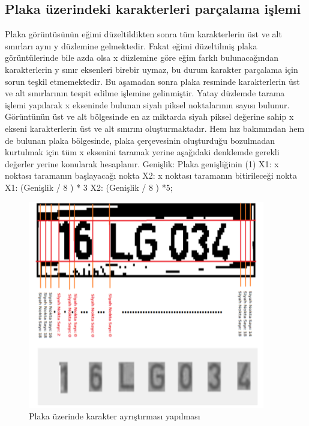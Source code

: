 \subsection{Plaka üzerindeki karakterleri parçalama işlemi}
Plaka görüntüsünün eğimi düzeltildikten sonra tüm karakterlerin üst ve alt sınırları aynı y düzlemine gelmektedir. Fakat eğimi düzeltilmiş plaka görüntülerinde bile azda olsa x düzlemine göre eğim farklı bulunacağından karakterlerin y sınır eksenleri birebir uymaz, bu durum karakter parçalama için sorun teşkil etmemektedir. Bu aşamadan sonra plaka resminde karakterlerin üst ve alt sınırlarının tespit edilme işlemine gelinmiştir. Yatay düzlemde tarama işlemi yapılarak x ekseninde bulunan siyah piksel noktalarının sayısı bulunur. Görüntünün üst ve alt bölgesinde en az miktarda siyah piksel değerine sahip x ekseni karakterlerin üst ve alt sınırını oluşturmaktadır. Hem hız bakımından hem de bulunan plaka bölgesinde, plaka çerçevesinin oluşturduğu bozulmadan kurtulmak için tüm x eksenini taramak yerine aşağıdaki denklemde gerekli değerler yerine konularak hesaplanır. 
Genişlik: Plaka genişliğinin (1)
X1: x noktası taramanın başlayacağı nokta
X2: x noktası taramanın bitirileceği nokta
X1: (Genişlik / 8 ) * 3
X2: (Genişlik / 8 ) *5;
\begin{figure}
    \centering
    \includegraphics{karakter ayrıştırma.PNG}
    \caption{Plaka üzerinde karakter ayrıştırması yapılması}
    \label{fig:my_label}
\end{figure}
